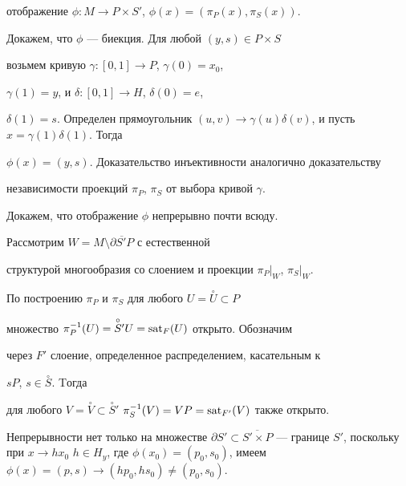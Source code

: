 \begin{pf}
отображение $\phi: M \to P \times S'$, $\phi(x)=(\pi_P(x),


\pi_S(x))$.





Докажем, что $\phi$ --- биекция. Для любой $(y,s) \in P \times S$


возьмем кривую $\gamma : [0,1] \to P$, $\gamma(0) = x_0$,


$\gamma(1) = y$, и $\delta: [0,1] \to H $, $\delta(0) = e$,


$\delta(1) = s$. Определен прямоугольник $(u,v) \to


\gamma(u)\delta(v)$, и пусть $x= \gamma(1)\delta(1)$. Тогда


$\phi(x)=(y,s)$. Доказательство инъективности  аналогично доказательству


независимости проекций $\pi_P$, $\pi_S$ от выбора кривой $\gamma$.





Докажем, что отображение $\phi$ непрерывно почти всюду.


Рассмотрим $W=M \setminus \overline{\partial S' P}$ с естественной


структурой многообразия со слоением и проекции $\pi_P|_{W}$, $\pi_S|_{W}$.


По построению $\pi_P$ и $\pi_S$ для любого $U=\overset{\circ}{U}{} \subset


P$


множество $\pi_P^{-1}(U)=\overset{\circ}{S}{}'U=\operatorname{sat}_F(U)$ открыто. Обозначим


через $F'$ слоение, определенное распределением, касательным к


$s P$, $s \in \overset{\circ}{S}$. Tогда


для любого $V=\overset{\circ}{V}{} \subset \overset{\circ}{S}{}'$ $\pi_S^{-


1}(V)=VP=\sat_{F'}(V)$ также открыто.





Непрерывности нет только на множестве $\partial S' \subset


\overline{S' \times P}$ --- границе $S'$, поскольку при $x \to h


x_0$ $h \in H_y$, где $\phi(x_0)=(p_0, s_0)$, имеем $\phi(x)=(p, s)


\to (h p_0, h s_0) \neq (p_0, s_0)$.


\end{pf}





